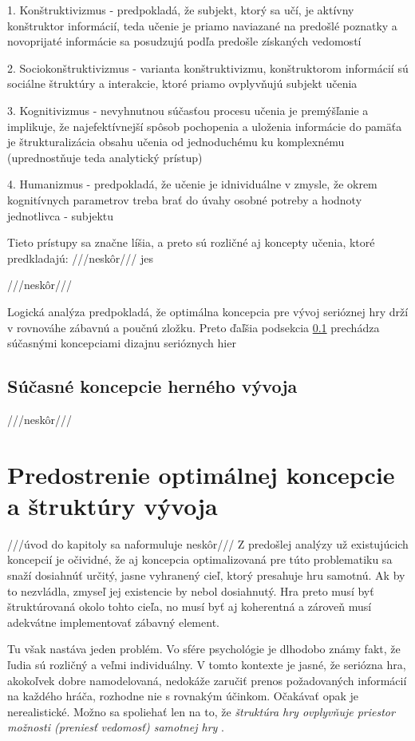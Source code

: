 \documentclass[10pt,twoside,slovak,a4paper]{article}
\begin{document}
1. Konštruktivizmus - predpokladá, že subjekt, ktorý sa učí, je aktívny konštruktor informácií, teda učenie je priamo naviazané na predošlé poznatky a novoprijaté informácie sa posudzujú podľa predošle získaných vedomostí

2. Sociokonštruktivizmus - varianta konštruktivizmu, konštruktorom informácií sú sociálne štruktúry a interakcie, ktoré priamo ovplyvňujú subjekt učenia

3.  Kognitivizmus - nevyhnutnou súčasťou procesu učenia je premýšľanie a implikuje, že najefektívnejší spôsob pochopenia a uloženia informácie do pamäťa je štrukturalizácia obsahu učenia od jednoduchému ku komplexnému (uprednostňuje teda analytický prístup)

4. Humanizmus - predpokladá, že učenie je idnividuálne v zmysle, že okrem kognitívnych parametrov treba brať do úvahy osobné potreby a hodnoty jednotlivca - subjektu

Tieto prístupy sa značne líšia, a preto sú rozličné aj koncepty učenia, ktoré predkladajú: ///neskôr/// jes

///neskôr///

Logická analýza predpokladá, že optimálna koncepcia pre vývoj serióznej hry drží v rovnováhe zábavnú a poučnú zložku. Preto ďaľšia podsekcia \ref{jadro:vyvoj} prechádza súčasnými koncepciami dizajnu serióznych hier
\subsection{Súčasné koncepcie herného vývoja} \label{jadro:vyvoj}
///neskôr///

\section{Predostrenie optimálnej koncepcie a štruktúry vývoja} \label{riesenie}
///úvod do kapitoly sa naformuluje neskôr///
Z predošlej analýzy už existujúcich koncepcií je očividné, že aj koncepcia optimalizovaná pre túto problematiku sa snaží dosiahnúť určitý, jasne vyhranený cieľ, ktorý presahuje hru samotnú. Ak by to nezvládla, zmyseľ jej existencie by nebol dosiahnutý. Hra preto musí byť štruktúrovaná okolo tohto cieľa, no musí byť aj koherentná a zároveň musí adekvátne implementovať zábavný element.

Tu však nastáva jeden problém. Vo sfére psychológie je dlhodobo známy fakt, že ľudia sú rozličný a veľmi individuálny. V tomto kontexte je jasné, že seriózna hra, akokoľvek dobre namodelovaná, nedokáže zaručiť prenos požadovaných informácií na každého hráča, rozhodne nie s rovnakým účinkom. Očakávať opak je nerealistické. Možno sa spoliehať len na to, že \emph{štruktúra hry ovplyvňuje priestor možnosti (preniesť vedomosť) samotnej hry} \cite{mitgutsch2012purposeful}.
\end{document}
